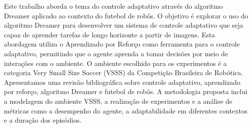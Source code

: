 
\begin{resumo} 

Este trabalho aborda o tema do controle adaptativo através do algoritmo Dreamer aplicado ao contexto do futebol de robôs. O objetivo é explorar o uso do algoritmo Dreamer para desenvolver um sistema de controle adaptativo que seja capaz de aprender tarefas de longo horizonte a partir de imagens. Esta abordagem utiliza o Aprendizado por Reforço como ferramenta para o controle adaptativo, permitindo que o agente aprenda a tomar decisões por meio de interações com o ambiente. O ambiente escolhido para os experimentos é a categoria Very Small Size Soccer (VSSS) da Competição Brasileira de Robótica. Apresentamos uma revisão bibliográfica sobre controle adaptativo, aprendizado por reforço, algoritmo Dreamer e futebol de robôs. A metodologia proposta inclui a modelagem do ambiente VSSS, a realização de experimentos e a análise de métricas como a desempenho do agente, a adaptabilidade em diferentes contextos e a duração dos episódios.

\end{resumo}

